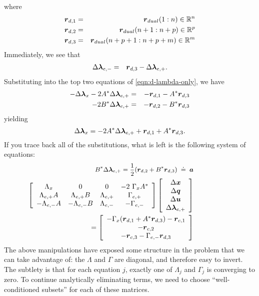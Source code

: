 where 
\begin{eqnarray*} 
\boldsymbol{r}_{d,1} &=& \boldsymbol{r}_{dual}(1:n) \in \mathbb R^n \\
\boldsymbol{r}_{d,2} &=& \boldsymbol{r}_{dual}(n+1:n+p) \in \mathbb R^p \\
\boldsymbol{r}_{d,3} &=& \boldsymbol{r}_{dual}(n+p+1:n+p+m) \in \mathbb R^m \\
\end{eqnarray*} 
Immediately, we see that 
\begin{eqnarray}
\Delta \boldsymbol{\lambda}_{e,-} &=& \boldsymbol{r}_{d,3} - \Delta \boldsymbol{\lambda}_{e,+}.
\end{eqnarray}
Substituting into the top two equations of \eqref{eqn:d-lambda-only}, we have
\begin{eqnarray}
-\Delta \boldsymbol{\lambda}_{x} - 2 A^* \Delta \boldsymbol{\lambda}_{e,+} &=& - \boldsymbol{r}_{d,1} - A^* \boldsymbol{r}_{d,3} \\
-2 B^* \Delta \boldsymbol{\lambda}_{e,+} &=& -\boldsymbol{r}_{d,2} - B^* \boldsymbol{r}_{d,3}
\end{eqnarray}
yielding
\begin{equation}
\Delta \boldsymbol{\lambda}_{x} = -2 A^* \Delta \boldsymbol{\lambda}_{e,+} +  \boldsymbol{r}_{d,1} + A^* \boldsymbol{r}_{d,3} .
\end{equation}
If you trace back all of the substitutions, what is left is the following system of equations:
\begin{eqnarray*}\small
B^* \Delta \blambda_{e,+} = \frac{1}{2} ( \r_{d,2} + B^* \r_{d,3} ) \;\doteq\; \a \\
\hspace{-.75in}\left[ \begin{array}{cccc} \Lambda_{x} & 0 & 0 & -2 \ \Gamma_{x} A^* \\ \Lambda_{e,+}A & \Lambda_{e,+} B & \Lambda_{e,+} & \Gamma_{e,+} \\ 
-\Lambda_{e,-} A& -\Lambda_{e,-} B & \Lambda_{e,-} & -\Gamma_{e,-} \end{array} \right] \left[ \begin{array}{c} \Delta \x \\ \Delta \q \\ \Delta \u \\ \Delta \blambda_{e,+} \end{array} \right] \\= \left[ \begin{array}{c} -\Gamma_{x} (\r_{d,1} + A^*\r_{d,3}) -\r_{c,1} \\ -\r_{c,2} \\ -\r_{c,3}-\Gamma_{e,-} \r_{d,3} \end{array} \right]
\end{eqnarray*}
The above manipulations have exposed some structure in the problem that we can take advantage of: the $\Lambda$ and $\Gamma$ are diagonal, and therefore easy to invert. The subtlety is that for each equation $j$, exactly one of $\Lambda_j$ and $\Gamma_j$ is converging to zero. To continue analytically eliminating terms, we need to choose ``well-conditioned subsets'' for each of these matrices. 

